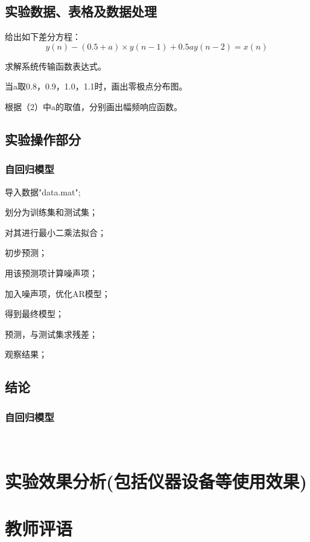\documentclass{whureport}
\begin{document}
  \subsection{实验数据、表格及数据处理}

    给出如下差分方程：
    $$y(n) - (0.5+a)\times y(n-1) + 0.5ay(n-2) = x(n)$$
    \begin{clause}
      \item 求解系统传输函数表达式。
      \item 当a取0.8，0.9，1.0，1.1时，画出零极点分布图。
      \item 根据（2）中a的取值，分别画出幅频响应函数。
    \end{clause}

  \subsection{实验操作部分}
  \subsubsection{自回归模型}
    \begin{clause}
      \item 导入数据"data.mat";
      \item 划分为训练集和测试集；
      \item 对其进行最小二乘法拟合；
      \item 初步预测；
      \item 用该预测项计算噪声项；
      \item 加入噪声项，优化AR模型；
      \item 得到最终模型；
      \item 预测，与测试集求残差；
      \item 观察结果；
    \end{clause}
  \subsection{结论}
  \subsubsection{自回归模型}
  \

\section{实验效果分析(包括仪器设备等使用效果)}




\section{教师评语}
\end{document}
